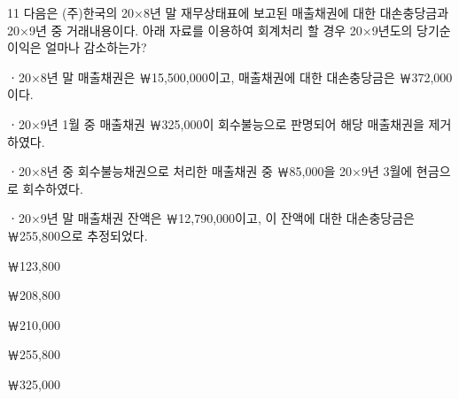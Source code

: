 \begin{question}{11}
다음은 (주)한국의 20×8년 말 재무상태표에 보고된 매출채권에 대한 대손충당금과 20×9년 중 거래내용이다. 아래 자료를 이용하여 회계처리 할 경우 20×9년도의 당기순이익은 얼마나 감소하는가?
\begin{framedtext}
ㆍ20×8년 말 매출채권은 ￦15,500,000이고, 매출채권에 대한 대손충당금은 ￦372,000이다. \par
ㆍ20×9년 1월 중 매출채권 ￦325,000이 회수불능으로 판명되어 해당 매출채권을 제거하였다. \par
ㆍ20×8년 중 회수불능채권으로 처리한 매출채권 중 ￦85,000을 20×9년 3월에 현금으로 회수하였다. \par
ㆍ20×9년 말 매출채권 잔액은 ￦12,790,000이고, 이 잔액에 대한 대손충당금은 ￦255,800으로 추정되었다. \par
\end{framedtext}
\begin{choices}
  \item ￦123,800
  \item ￦208,800
  \item ￦210,000
  \item ￦255,800
  \item ￦325,000
\end{choices}
\end{question}
